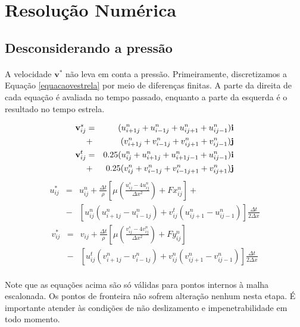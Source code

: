 \documentclass[poisson.tex]{subfiles}
\begin{document}
\section{Resolução Numérica}
\subsection{Desconsiderando a pressão}
\paragraph{} A velocidade $\textbf{v}^*$ não leva em conta a pressão. Primeiramente, discretizamos a Equação  \ref{equacaovestrela} por meio de diferenças finitas. A parte da direita de cada equação é avaliada no tempo passado, enquanto a parte da esquerda é o resultado no tempo estrela.

\begin{eqnarray}
\textbf{v}_{ij}^s&=&({u}_{i+1j}^n+{u}_{i-1j}^n+{u}_{ij+1}^n+{u}_{ij-1}^n)\textbf{i} \nonumber \\&+& ({v}_{i+1j}^n+{v}_{i-1j}^n+{v}_{ij+1}^n+{v}_{ij-1}^n)\textbf{j}\\
\textbf{v}_{ij}^t&=&0.25(u_{ij}^n+u_{i+1j}^n+u_{i+1j-1}^n+u_{ij-1}^n)\textbf{i} \nonumber \\ &+& 0.25(v_{ij}^n+v_{i-1j}^n+v_{i-1j+1}^n+v_{ij+1}^n)\textbf{j}
\end{eqnarray}
\begin{eqnarray}
u_{ij}^{*}&=&u_{ij}^n+\frac{\Delta t}{\rho}\left[\mu\left(\frac{u_{ij}^s-4u_{ij}^n}{\Delta
x^2}\right)+Fx_{ij}^n\right] + \nonumber \\
&-&\left[u_{ij}^n(u_{i+1j}^n-u_{i-1j}^n)+v_{ij}^t(u_{ij+1}^n-u_{ij-1}^n)\right]\frac{\Delta t}{2\Delta x}
\end{eqnarray}
\begin{eqnarray}
v_{ij}^{*}&=&v_{ij}+\frac{\Delta t}{\rho}\left[\mu\left(\frac{v_{ij}^s-4v_{ij}^n}{\Delta
x^2}\right)+Fy_{ij}^n\right] \nonumber \\
&-&\left[u_{ij}^t (v_{i+1j}^n-v_{i-1j}^n)+v_{ij}^n(v_{ij+1}^n-v_{ij-1}^n)\right]\frac{\Delta t}{2\Delta x}
\end{eqnarray}

\paragraph{} Note que as equações acima são só válidas para pontos internos à malha escalonada. Os pontos de fronteira  não sofrem alteração nenhum nesta etapa. É importante atender às condições de não deslizamento e impenetrabilidade em todo momento. 
\end{document}
